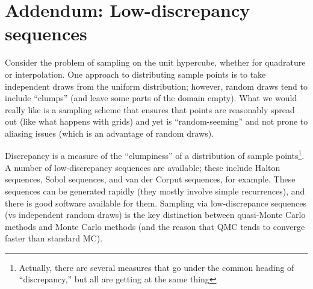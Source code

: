 \documentclass[12pt, leqno]{article} %
\begin{document}
\section{Addendum: Low-discrepancy sequences}

Consider the problem of sampling on the unit hypercube, whether for
quadrature or interpolation.  One approach to distributing sample
points is to take independent draws from the uniform distribution;
however, random draws tend to include ``clumps'' (and leave some parts
of the domain empty).  What we would really like is a sampling scheme
that ensures that points are reasonably spread out (like what happens
with grids) and yet is ``random-seeming'' and not prone to aliasing
issues (which is an advantage of random draws).

Discrepancy is a measure of the ``clumpiness'' of a distribution of
sample points\footnote{Actually, there are several measures that go
  under the common heading of ``discrepancy,'' but all are getting at
  the same thing}.
A number of low-discrepancy sequences are available; these include
Halton sequences, Sobol sequences, and van der Corput sequences, for
example.  These sequences can be generated rapidly (they mostly
involve simple recurrences), and there is good software available for
them.  Sampling via low-discrepance sequences (vs independent random
draws) is the key distinction between quasi-Monte Carlo methods and
Monte Carlo methods (and the reason that QMC tends to converge faster
than standard MC).
\end{document}
